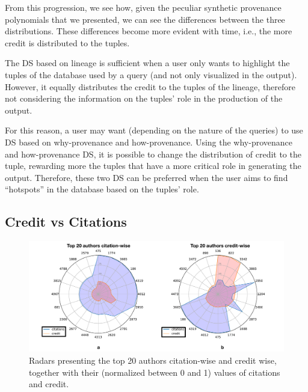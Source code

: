 From this progression, we see how, given the peculiar synthetic provenance polynomials that we presented, we can see the differences between the three distributions. These differences become more evident with time, i.e., the more credit is distributed to the tuples. 

The DS based on lineage is sufficient when a user only wants to highlight the tuples of the database used by a query (and not only visualized in the output). However, it equally distributes the credit to the tuples of the lineage, therefore not considering the information on the tuples' role in the production of the output. 

For this reason, a user may want (depending on the nature of the queries) to use DS based on why-provenance and how-provenance. %
Using the why-provenance and how-provenance DS, it is possible to change the distribution of credit to the tuple, rewarding more the tuples that have a more critical role in generating the output. Therefore, these two DS can be preferred when the user aims to find ``hotspots'' in the database based on the tuples' role. 



\subsection{Credit vs Citations}

\begin{figure}[]
\centering
  \includegraphics[width=1\textwidth]{figures/2_radars}
  \caption{Radars presenting the top 20 authors citation-wise and credit wise, together with their (normalized between 0 and 1) values of citations and credit.}
  \label{figure:2_radars}
\end{figure}


